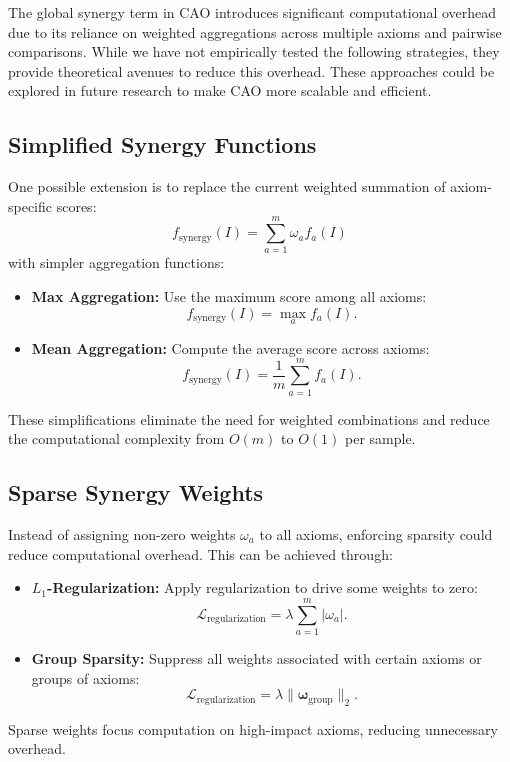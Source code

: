 The global synergy term in CAO introduces significant computational overhead due to its reliance on weighted aggregations across multiple axioms and pairwise comparisons. While we have not empirically tested the following strategies, they provide theoretical avenues to reduce this overhead. These approaches could be explored in future research to make CAO more scalable and efficient.

\subsection{Simplified Synergy Functions}
One possible extension is to replace the current weighted summation of axiom-specific scores:
\[
f_{\text{synergy}}(I) = \sum_{a=1}^m \omega_a f_a(I)
\]
with simpler aggregation functions:
\begin{itemize}
    \item \textbf{Max Aggregation:} Use the maximum score among all axioms:
    \[
    f_{\text{synergy}}(I) = \max_{a} f_a(I).
    \]
    \item \textbf{Mean Aggregation:} Compute the average score across axioms:
    \[
    f_{\text{synergy}}(I) = \frac{1}{m} \sum_{a=1}^m f_a(I).
    \]
\end{itemize}
These simplifications eliminate the need for weighted combinations and reduce the computational complexity from \(O(m)\) to \(O(1)\) per sample.

\subsection{Sparse Synergy Weights}
Instead of assigning non-zero weights \(\omega_a\) to all axioms, enforcing sparsity could reduce computational overhead. This can be achieved through:
\begin{itemize}
    \item \textbf{\(L_1\)-Regularization:} Apply regularization to drive some weights to zero:
    \[
    \mathcal{L}_{\text{regularization}} = \lambda \sum_{a=1}^m |\omega_a|.
    \]
    \item \textbf{Group Sparsity:} Suppress all weights associated with certain axioms or groups of axioms:
 \[
\mathcal{L}_{\text{regularization}} = \lambda \|\mathbf{\omega}_{\text{group}}\|_2.
\]

\end{itemize}
Sparse weights focus computation on high-impact axioms, reducing unnecessary overhead.

